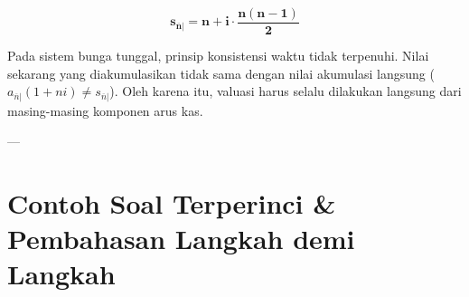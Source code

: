 \documentclass[11pt,a4paper]{article}
\begin{document}
\begin{definitionbox}
\begin{equation}
    \mathbf{s_{\overline{n}|} = n + i \cdot \frac{n(n-1)}{2}}
\end{equation}
\end{definitionbox}

\begin{notebox}
Pada sistem bunga tunggal, prinsip konsistensi waktu tidak terpenuhi. Nilai sekarang yang diakumulasikan tidak sama dengan nilai akumulasi langsung ($a_{\overline{n}|}(1+ni) \neq s_{\overline{n}|}$). Oleh karena itu, valuasi harus selalu dilakukan langsung dari masing-masing komponen arus kas.
\end{notebox}

---

\section{Contoh Soal Terperinci \& Pembahasan Langkah demi Langkah}
\end{document}
